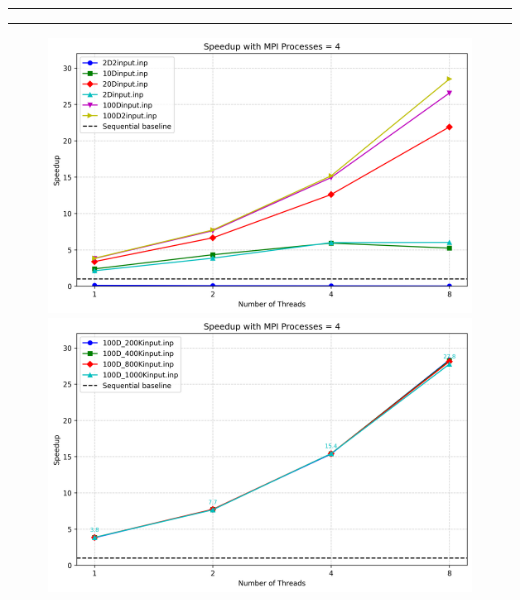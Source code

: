 \documentclass{article}
\begin{document}
  \begin{center}
    \rule{2.5cm}{1pt}  \rule{2.5cm}{1pt}
  \end{center}
  \begin{figure}[ht]
    \centering
    \begin{minipage}{0.4\textwidth}
      \centering
      \includegraphics[width=\linewidth]{../test_csv/plots/speedup/plot_omp_mpi_4_small_slurm.png}
    \end{minipage}
    \begin{minipage}{0.4\textwidth}
      \centering
      \includegraphics[width=\linewidth]{../test_csv/plots/speedup/plot_omp_mpi_4_big_slurm.png}
    \end{minipage}
    \begin{minipage}{0.4\textwidth}
      \centering

\end{minipage}
\end{figure}
\end{document}
